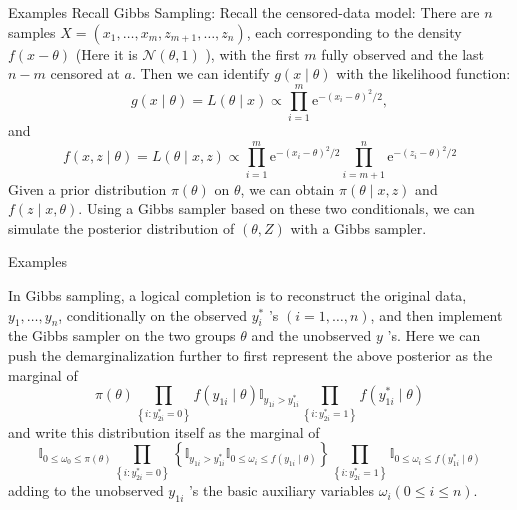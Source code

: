 \documentclass{beamer}
\begin{document}
\begin{frame}{Examples}
	\small
	Recall Gibbs Sampling:
	Recall the censored-data model: There are $n$ samples $X=\left(x_{1}, \ldots, x_{m}, z_{m+1}, \ldots, z_{n}\right)$, each corresponding to the density $f(x-\theta)$ (Here it is $\mathcal{N}(\theta, 1)$ ), with the first $m$ fully observed and the last $n-m$ censored at $a$. Then we can identify $g(x \mid \theta)$ with the likelihood function:
	$$
	g(x \mid \theta)=L(\theta \mid x) \propto \prod_{i=1}^{m} \mathrm{e}^{-\left(x_{i}-\theta\right)^{2} / 2},
	$$
	and
	$$
	f(x, z \mid \theta)=L(\theta \mid x, z) \propto \prod_{i=1}^{m} \mathrm{e}^{-\left(x_{i}-\theta\right)^{2} / 2} \prod_{i=m+1}^{n} \mathrm{e}^{-\left(z_{i}-\theta\right)^{2} / 2}
	$$
	Given a prior distribution $\pi(\theta)$ on $\theta$, we can obtain $\pi(\theta \mid x, z)$ and $f(z \mid x, \theta)$. Using a Gibbs sampler based on these two conditionals, we can simulate the posterior distribution of $(\theta, Z)$ with a Gibbs sampler.
\end{frame}

\begin{frame}{Examples} \small
	\begin{example}
		In Gibbs sampling, a logical completion is to reconstruct the original data, $y_{1}, \ldots, y_{n}$, conditionally on the observed $y_{i}^{*}$ 's $(i=1, \ldots, n)$, and then implement the Gibbs sampler on the two groups $\theta$ and the unobserved $y$ 's. Here we can push the demarginalization further to first represent the above posterior as the marginal of
		$$
		\pi(\theta) \prod_{\left\{i: y_{2 i}^{*}=0\right\}} f\left(y_{1 i} \mid \theta\right) \mathbb{I}_{y_{1 i}>y_{1 i}^{*}} \prod_{\left\{i: y_{2 i}^{*}=1\right\}} f\left(y_{1 i}^{*} \mid \theta\right)
		$$
		and write this distribution itself as the marginal of
		$$
		\mathbb{I}_{0 \leq \omega_{0} \leq \pi(\theta)} \prod_{\left\{i: y_{2 i}^{*}=0\right\}}\left\{\mathbb{I}_{y_{1 i}>y_{1 i}^{*}} \mathbb{I}_{0 \leq \omega_{i} \leq f\left(y_{1 i} \mid \theta\right)}\right\} \prod_{\left\{i: y_{2 i}^{*}=1\right\}} \mathbb{I}_{0 \leq \omega_{i} \leq f\left(y_{1 i}^{*} \mid \theta\right)}
		$$
		adding to the unobserved $y_{1 i}$ 's the basic auxiliary variables $\omega_{i}(0 \leq i \leq n) .$
	\end{example}
	
\end{frame}
\end{document}

